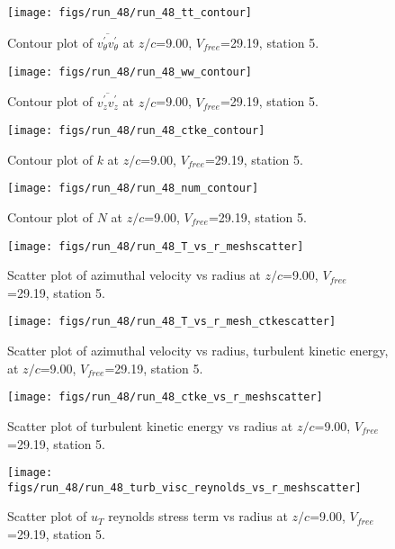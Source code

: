 \begin{figure}[H]
\centering
\texttt{[image: figs/run\_48/run\_48\_tt\_contour]}
\caption{Contour plot of $\overline{v_{\theta}^{\prime} v_{\theta}^{\prime}}$ at $z/c$=9.00, $V_{free}$=29.19, station 5.}
\end{figure}


\begin{figure}[H]
\centering
\texttt{[image: figs/run\_48/run\_48\_ww\_contour]}
\caption{Contour plot of $\overline{v_{z}^{\prime} v_{z}^{\prime}}$ at $z/c$=9.00, $V_{free}$=29.19, station 5.}
\end{figure}


\begin{figure}[H]
\centering
\texttt{[image: figs/run\_48/run\_48\_ctke\_contour]}
\caption{Contour plot of $k$ at $z/c$=9.00, $V_{free}$=29.19, station 5.}
\end{figure}


\begin{figure}[H]
\centering
\texttt{[image: figs/run\_48/run\_48\_num\_contour]}
\caption{Contour plot of $N$ at $z/c$=9.00, $V_{free}$=29.19, station 5.}
\end{figure}


\begin{figure}[H]
\centering
\texttt{[image: figs/run\_48/run\_48\_T\_vs\_r\_meshscatter]}
\caption{Scatter plot of azimuthal velocity vs radius at $z/c$=9.00, $V_{free}$=29.19, station 5.}
\end{figure}


\begin{figure}[H]
\centering
\texttt{[image: figs/run\_48/run\_48\_T\_vs\_r\_mesh\_ctkescatter]}
\caption{Scatter plot of azimuthal velocity vs radius, turbulent kinetic energy, at $z/c$=9.00, $V_{free}$=29.19, station 5.}
\end{figure}


\begin{figure}[H]
\centering
\texttt{[image: figs/run\_48/run\_48\_ctke\_vs\_r\_meshscatter]}
\caption{Scatter plot of turbulent kinetic energy vs radius at $z/c$=9.00, $V_{free}$=29.19, station 5.}
\end{figure}


\begin{figure}[H]
\centering
\texttt{[image: figs/run\_48/run\_48\_turb\_visc\_reynolds\_vs\_r\_meshscatter]}
\caption{Scatter plot of $
u_T$ reynolds stress term vs radius at $z/c$=9.00, $V_{free}$=29.19, station 5.}
\end{figure}


